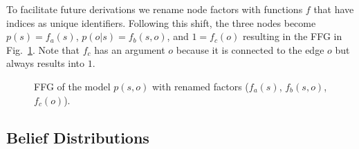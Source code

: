 To facilitate future derivations we rename node factors with functions \(f\) that have indices as unique identifiers. Following this shift, the three nodes become \(p(s)=f_a(s)\), \(p(o|s)=f_b(s,o)\), and \(1=f_c(o)\) resulting in the FFG in Fig.~\ref{fig:3}. Note that \(f_c\) has an argument \(o\) because it is connected to the edge \(o\) but always results into \(1\).
\begin{figure}[htbp]
    \centering


    \caption{FFG of the model \(p(s,o)\) with renamed factors (\(f_a(s)\), \(f_b(s,o)\), \(f_c(o)\)).}
    \label{fig:3}
\end{figure}

\subsection{Belief Distributions}

